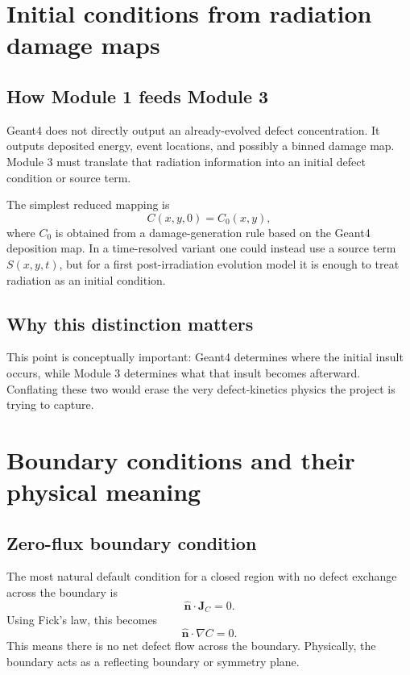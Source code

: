 \documentclass[11pt]{article}
\begin{document}
\section{Initial conditions from radiation damage maps}

\subsection{How Module 1 feeds Module 3}

Geant4 does not directly output an already-evolved defect concentration. It outputs deposited energy, event locations, and possibly a binned damage map. Module 3 must translate that radiation information into an initial defect condition or source term.

The simplest reduced mapping is
\begin{equation}
C(x,y,0) = C_0(x,y),
\end{equation}
where $C_0$ is obtained from a damage-generation rule based on the Geant4 deposition map. In a time-resolved variant one could instead use a source term $S(x,y,t)$, but for a first post-irradiation evolution model it is enough to treat radiation as an initial condition.

\subsection{Why this distinction matters}

This point is conceptually important: Geant4 determines where the initial insult occurs, while Module 3 determines what that insult becomes afterward. Conflating these two would erase the very defect-kinetics physics the project is trying to capture.

\section{Boundary conditions and their physical meaning}

\subsection{Zero-flux boundary condition}

The most natural default condition for a closed region with no defect exchange across the boundary is
\begin{equation}
\hat{\mathbf{n}} \cdot \mathbf{J}_C = 0.
\end{equation}
Using Fick's law, this becomes
\begin{equation}
\hat{\mathbf{n}} \cdot \nabla C = 0.
\end{equation}
This means there is no net defect flow across the boundary. Physically, the boundary acts as a reflecting boundary or symmetry plane.
\end{document}
